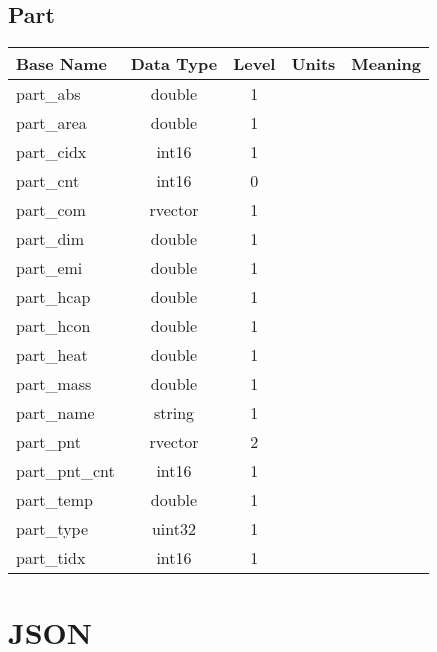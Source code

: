 \documentclass[10pt,letterpaper]{report}
\begin{document}
\section{Part}
\begin{tabular}{|l|c|c|l|l|}
\hline \textbf{Base Name} &\textbf{Data Type}  & \textbf{Level} & \textbf{Units} & \textbf{Meaning}\\ 
\hline part\_abs & double & 1 &  &  \\ 
\hline part\_area & double & 1 &  &  \\ 
\hline part\_cidx & int16 & 1 &  &  \\ 
\hline part\_cnt & int16 & 0 &  &  \\ 
\hline part\_com & rvector & 1 &  &  \\ 
\hline part\_dim & double & 1 &  &  \\ 
\hline part\_emi & double & 1 &  &  \\ 
\hline part\_hcap & double & 1 &  &  \\ 
\hline part\_hcon & double & 1 &  &  \\ 
\hline part\_heat & double & 1 &  &  \\ 
\hline part\_mass & double & 1 &  &  \\ 
\hline part\_name & string & 1 &  &  \\ 
\hline part\_pnt & rvector & 2 &  &  \\ 
\hline part\_pnt\_cnt & int16 & 1 &  &  \\ 
\hline part\_temp & double & 1 &  &  \\ 
\hline part\_type & uint32 & 1 &  &  \\ 
\hline part\_tidx & int16 & 1 &  &  \\ 
\hline
\end{tabular}
\chapter{JSON}

\section{}
\end{document}
